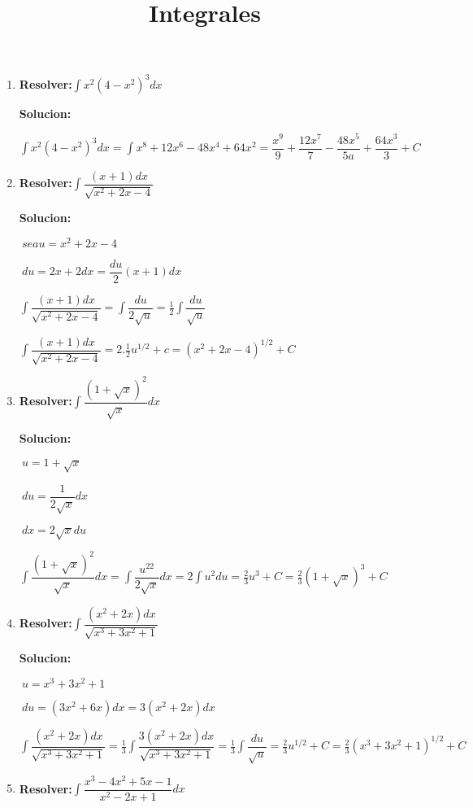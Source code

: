\documentclass[10pt,a4paper]{book}
\title{Integrales}
\newcommand{\ds}{\displaystyle}
\begin{document}
\begin{enumerate} 
    \item \textbf{Resolver:}$\ds\int x^2(4-x^2)^3 dx$

        \textbf{Solucion:}

        $\ds\int x^2(4-x^2)^3 dx =\int x^8+12x^6-48x^4+64x^2=\dfrac{x^9}{9}+\dfrac{12x^7}{7}
        -\dfrac{48x^5}{5a}+\dfrac{64x^3}{3}+C$
    \vspace{0.5cm}
    \item \textbf{Resolver:}$\ds\int\dfrac{(x+1)dx}{\sqrt{x^2+2x-4} }$
     
        \textbf{Solucion:}

        $\ds\ sea u=x^2+2x-4$ 

        $\ds\ du=2x+2dx=\dfrac{du}{2}(x+1)dx$

        $\ds\int\dfrac{(x+1)dx}{\sqrt{x^2+2x-4}}=\int\dfrac{du}{2\sqrt{u}}=\frac{1}{2}\int\dfrac{du}{\sqrt{u}}$

        $\ds\int\dfrac{(x+1)dx}{\sqrt{x^2+2x-4} }=2.\frac{1}{2}u^{1/2}+c=(x^2+2x-4)^{1/2}+C$
    \vspace{0.5cm}
    \item \textbf{Resolver:}$\ds\int\dfrac{(1+\sqrt{x})^2 }{\sqrt{x} }dx$
    
        \textbf{Solucion:}

        $\ds\ u=1+\sqrt{x}$
        
        $\ds\ du=\dfrac{1}{2\sqrt{x}}dx $

        $\ds\ dx=2\sqrt{x}du$
        
        $\ds\int\dfrac{(1+\sqrt{x})^2}{\sqrt{x}}dx=\int\dfrac{u^22}{2\sqrt{x}}dx=2\int u^2du=\frac{2}{3}u^3+C=\frac{2}{3}(1+\sqrt{x})^3+C$

    \vspace{0.5cm}
    \item \textbf{Resolver:}$\ds\int\dfrac{(x^2+2x)dx}{\sqrt{x^3+3x^2+1} }$
    
        \textbf{Solucion:}

        $\ds\ u=x^3+3x^2+1$

        $\ds\ du=(3x^2+6x)dx=3(x^2+2x)dx$

        $\ds\int\dfrac{(x^2+2x)dx}{\sqrt{x^3+3x^2+1}}=\frac{1}{3}\int\dfrac{3(x^2+2x)dx}{\sqrt{x^3+3x^2+1}}=\frac{1}{3}\int\dfrac{du}{\sqrt{u}}=\frac{2}{3}u^{1/2}+C=
        \frac{2}{3}(x^3+3x^2+1)^{1/2}+C$
        
    \vspace{0.5cm}
    \item \textbf{Resolver:}$\ds\int\dfrac{x^3-4x^2+5x-1}{x^2-2x+1}dx$
    

\end{enumerate}
\end{document}
